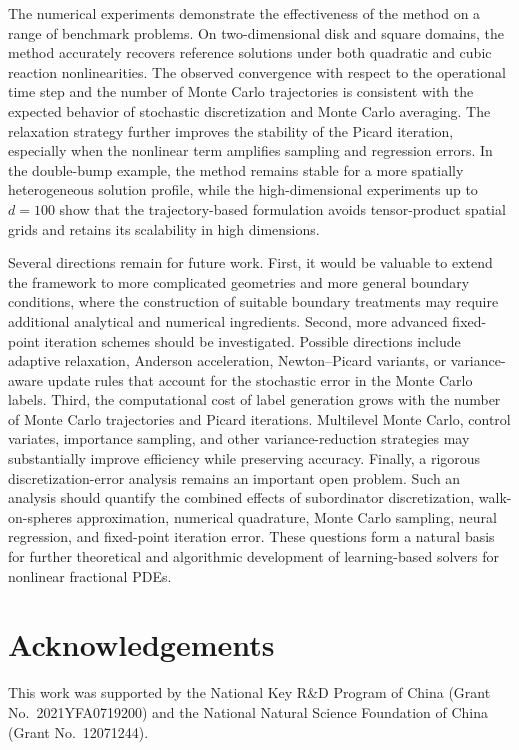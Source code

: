 \documentclass[a4paper,fleqn]{cas-sc}
\begin{document}
The numerical experiments demonstrate the effectiveness of the method on a
range of benchmark problems. On two-dimensional disk and square domains, the
method accurately recovers reference solutions under both quadratic and cubic
reaction nonlinearities. The observed convergence with respect to the
operational time step and the number of Monte Carlo trajectories is consistent
with the expected behavior of stochastic discretization and Monte Carlo
averaging. The relaxation strategy further improves the stability of the
Picard iteration, especially when the nonlinear term amplifies sampling and
regression errors. In the double-bump example, the method remains stable for a
more spatially heterogeneous solution profile, while the high-dimensional
experiments up to $d=100$ show that the trajectory-based formulation avoids
tensor-product spatial grids and retains its scalability in high dimensions.

Several directions remain for future work. First, it would be valuable to extend
the framework to more complicated geometries and more general boundary
conditions, where the construction of suitable boundary treatments may require
additional analytical and numerical ingredients. Second, more advanced
fixed-point iteration schemes should be investigated. Possible directions
include adaptive relaxation, Anderson acceleration, Newton--Picard variants, or
variance-aware update rules that account for the stochastic error in the Monte
Carlo labels. Third, the computational cost of label generation grows with the
number of Monte Carlo trajectories and Picard iterations. Multilevel Monte
Carlo, control variates, importance sampling, and other variance-reduction
strategies may substantially improve efficiency while preserving accuracy.
Finally, a rigorous discretization-error analysis remains an important open
problem. Such an analysis should quantify the combined effects of subordinator
discretization, walk-on-spheres approximation, numerical quadrature, Monte
Carlo sampling, neural regression, and fixed-point iteration error. These
questions form a natural basis for further theoretical and algorithmic
development of learning-based solvers for nonlinear fractional PDEs.

\section*{Acknowledgements}
This work was supported by the National Key R\&D Program of China (Grant No.\ 2021YFA0719200) and the National Natural Science Foundation of China (Grant No.\ 12071244).



\end{document}
